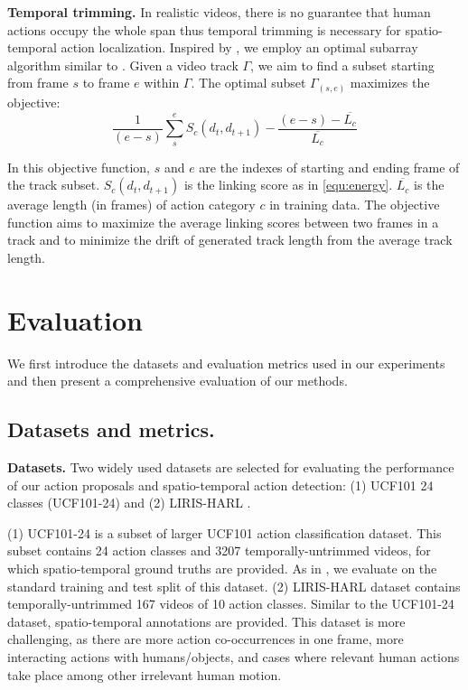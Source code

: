 \documentclass{bmvc2k}
\begin{document}
\textbf{Temporal trimming.} In realistic videos, there is no guarantee that human actions occupy the whole span thus temporal trimming is necessary for spatio-temporal action localization. Inspired by \cite{an2009efficient}, we employ an optimal subarray algorithm similar to \cite{peng2016multi}. Given a video track $\Gamma$, we aim to find a subset starting from frame $s$ to frame $e$ within $\Gamma$. The optimal subset $\Gamma_{(s,e)}$ maximizes the objective:
\begin{equation}
\frac{1}{(e-s)}\sum_s^e S_c(d_t, d_{t+1})-\frac{(e-s)-\overline{L_c}}{\overline{L_c}}
\end{equation}

In this objective function, $s$ and $e$ are the indexes of starting and ending frame of the track subset. $S_c(d_t, d_{t+1})$ is the linking score as in \ref{equ:energy}. $\overline{L_c}$ is the average length (in frames) of action category $c$ in training data. The objective function aims to maximize the average linking scores between two frames in a track and to minimize the drift of generated track length from the average track length. 

\section{Evaluation}

We first introduce the datasets and evaluation metrics used in our experiments and then present a comprehensive evaluation of our methods.

\subsection{Datasets and metrics.}

\textbf{Datasets.} Two widely used datasets are selected for evaluating the performance of our action proposals and spatio-temporal action detection: (1) UCF101 \cite{soomro2012ucf101} 24 classes (UCF101-24) and (2) LIRIS-HARL \cite{wolf2014evaluation}.

(1) UCF101-24 is a subset of larger UCF101 action classification dataset. This subset contains 24 action classes and 3207 temporally-untrimmed videos, for which spatio-temporal ground truths are provided. As in \cite{suman16bmvc,peng2016multi}, we evaluate on the standard training and test split of this dataset.  (2) LIRIS-HARL dataset contains temporally-untrimmed 167 videos of 10 action classes. Similar to the UCF101-24 dataset, spatio-temporal annotations are provided. This dataset is more challenging, as there are more action co-occurrences in one frame, more interacting actions with humans/objects, and cases where relevant human actions take place among other irrelevant human motion.
\end{document}
